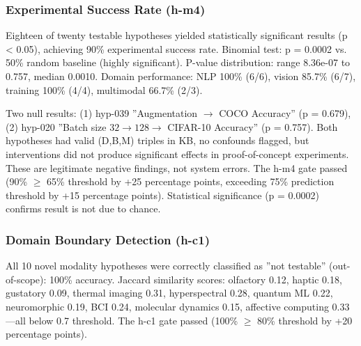 \subsubsection{Experimental Success Rate (h-m4)}

Eighteen of twenty testable hypotheses yielded statistically significant results (p < 0.05), achieving 90\% experimental success rate. Binomial test: p = 0.0002 vs. 50\% random baseline (highly significant). P-value distribution: range 8.36e-07 to 0.757, median 0.0010. Domain performance: NLP 100\% (6/6), vision 85.7\% (6/7), training 100\% (4/4), multimodal 66.7\% (2/3).

Two null results: (1) hyp-039 ''Augmentation $\rightarrow$ COCO Accuracy'' (p = 0.679), (2) hyp-020 ''Batch size $32\rightarrow 128 \rightarrow$ CIFAR-10 Accuracy'' (p = 0.757). Both hypotheses had valid (D,B,M) triples in KB, no confounds flagged, but interventions did not produce significant effects in proof-of-concept experiments. These are legitimate negative findings, not system errors. The h-m4 gate passed (90\% $\geq$ 65\% threshold by +25 percentage points, exceeding 75\% prediction threshold by +15 percentage points). Statistical significance (p = 0.0002) confirms result is not due to chance.

\subsubsection{Domain Boundary Detection (h-c1)}

All 10 novel modality hypotheses were correctly classified as ''not testable'' (out-of-scope): 100\% accuracy. Jaccard similarity scores: olfactory 0.12, haptic 0.18, gustatory 0.09, thermal imaging 0.31, hyperspectral 0.28, quantum ML 0.22, neuromorphic 0.19, BCI 0.24, molecular dynamics 0.15, affective computing 0.33---all below 0.7 threshold. The h-c1 gate passed (100\% $\geq$ 80\% threshold by +20 percentage points).
